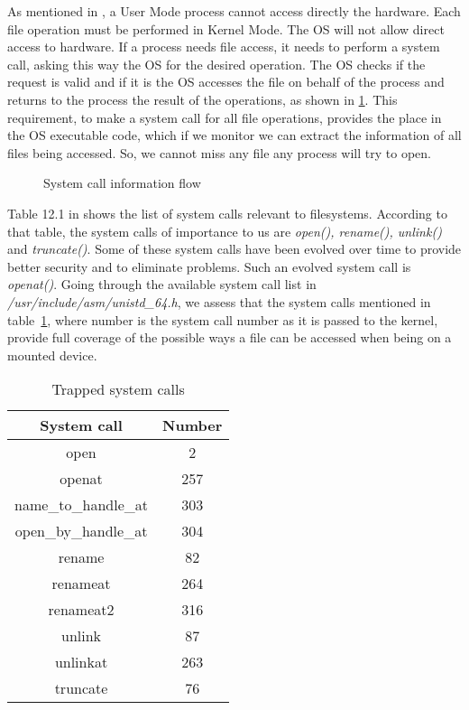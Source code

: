 \par As mentioned in \cite{linuxkernel}, a User Mode process cannot access directly the hardware. Each file operation must be performed in Kernel Mode. The \ac{OS} will not allow direct access to hardware. If a process needs file access, it needs to perform a system call, asking this way the \ac{OS} for the desired operation. The \ac{OS} checks if the request is valid and if it is the \ac{OS} accesses the file on behalf of the process and returns to the process the result of the operations, as shown in \ref{fig:syscall}. This requirement, to make a system call for all file operations, provides the place in the \ac{OS} executable code, which if we monitor we can extract the information of all files being accessed. So, we cannot miss any file any process will try to open.

\begin{figure}[ht]
	\centering
	
	\caption{System call information flow}
	\label{fig:syscall}
\end{figure}

\par Table 12.1 in \cite{linuxkernel} shows the list of system calls relevant to filesystems. According to that table, the system calls of importance to us are \emph{open(), rename(), unlink()} and \emph{truncate()}. Some of these system calls have been evolved over time to provide better security and to eliminate problems. Such an evolved system call is \emph{openat()}. Going through the available system call list in \emph{/usr/include/asm/unistd\_64.h}, we assess that the system calls mentioned in table~\ref{tbl:syscalls}, where number is the system call number as it is passed to the kernel, provide full coverage of the possible ways a file can be accessed when being on a mounted device. 

\begin{table}[ht]
	\centering
	\caption{Trapped system calls}
	\label{tbl:syscalls}
	\begin{tabular}{cc}
		\toprule
		System call & Number \\
		\hline
		open & 2 \\ 
		openat & 257 \\ 
		name\_to\_handle\_at & 303 \\
		open\_by\_handle\_at & 304 \\
		rename & 82 \\ 
		renameat & 264 \\  
		renameat2 & 316 \\ 
		unlink & 87 \\ 
		unlinkat & 263 \\
		truncate & 76 \\
		\bottomrule
	\end{tabular}	
\end{table}



